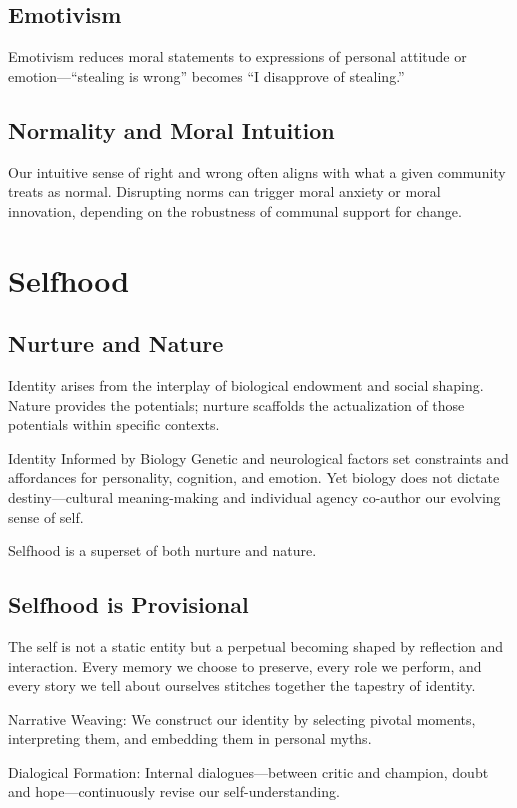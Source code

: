 \documentclass[a4paper]{article}
\begin{document}
\subsection{Emotivism}
Emotivism reduces moral statements to expressions of personal attitude or emotion—“stealing is wrong” becomes “I disapprove of stealing.”

\subsection{Normality and Moral Intuition}
Our intuitive sense of right and wrong often aligns with what a given community treats as normal. 
Disrupting norms can trigger moral anxiety or moral innovation, depending on the robustness of communal support for change.

\section{Selfhood}
\subsection{Nurture and Nature}
Identity arises from the interplay of biological endowment and social shaping. 
Nature provides the potentials; nurture scaffolds the actualization of those potentials within specific contexts.

Identity Informed by Biology
Genetic and neurological factors set constraints and affordances for personality, cognition, and emotion. 
Yet biology does not dictate destiny—cultural meaning-making and individual agency co-author our evolving sense of self.

Selfhood is a superset of both nurture and nature.

\subsection{Selfhood is Provisional}
The self is not a static entity but a perpetual becoming shaped by reflection and interaction. 
Every memory we choose to preserve, every role we perform, and every story we tell about ourselves stitches together the tapestry of identity.

Narrative Weaving: We construct our identity by selecting pivotal moments, interpreting them, and embedding them in personal myths.

Dialogical Formation: Internal dialogues—between critic and champion, doubt and hope—continuously revise our self-understanding.
\end{document}
